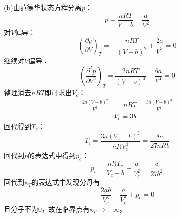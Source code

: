 \begin{solution}
        (b)由范德华状态方程分离$p$：
        \begin{equation*}
            p = \frac{nRT}{V-b}-\frac{a}{V^{2}}
        \end{equation*}
        对$V$偏导：
        \begin{equation*}
            \left(\frac{\partial p}{\partial V}\right)_{T} = -\frac{nRT}{(V-b)^{2}} + \frac{2a}{V^{3}} = 0
        \end{equation*}
        继续对$V$偏导：
        \begin{equation*}
            \left(\frac{\partial^{2} p}{\partial V^{2}}\right)_{T} = \frac{2nRT}{(V-b)^{3}} - \frac{6a}{V^{4}} = 0
        \end{equation*}
        整理消去$nRT$即可求出$V_c$：
        \begin{equation*}
            \begin{aligned}
                \frac{2a(V-b)^{2}}{V^{3}} &= nRT = \frac{3a(V-b)^{3}}{V^{4}}\\
                &V_c = 3b
            \end{aligned}
        \end{equation*}
        回代得到$T_c$：
        \begin{equation*}
            T_c = \frac{3a(V_{c}-b)^{3}}{nRV_{c}^{4}} = \frac{8a}{27nRb}
        \end{equation*}
        回代到$p$的表达式中得到$p_c$：
        \begin{equation*}
            p_c = \frac{nRT_c}{V_{c}-b}-\frac{a}{V_{c}^{2}} = \frac{a}{27b^{2}}
        \end{equation*}
        回代到$\kappa_T$的表达式中发现分母有
        \begin{equation*}
            \frac{2ab}{V_{c}^{3}}-\frac{a}{V_{c}^{2}}+p_{c} = 0
        \end{equation*}
        且分子不为0，故在临界点有$\kappa_T\rightarrow +\infty$。
        \\


\end{solution}
